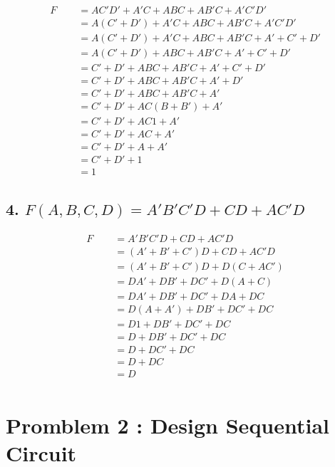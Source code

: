 \documentclass[12pt, letterpaper]{article}
\begin{document}
\begin{align*}
    F&=AC'D'+A'C+ABC+AB'C+A'C'D'\\
    \qquad &=A(C'+D')+A'C+ABC+AB'C+A'C'D'\\
    \qquad &=A(C'+D')+A'C+ABC+AB'C+A'+C'+D'\\
    \qquad &=A(C'+D')+ABC+AB'C+A'+C'+D'\\
    \qquad &=C'+D'+ABC+AB'C+A'+C'+D'\\
    \qquad &=C'+D'+ABC+AB'C+A'+D'\\
    \qquad &=C'+D'+ABC+AB'C+A'\\
    \qquad &=C'+D'+AC(B+B')+A'\\
    \qquad &=C'+D'+AC1+A'\\
    \qquad &=C'+D'+AC+A'\\
    \qquad &=C'+D'+A+A'\\
    \qquad &=C'+D'+1\\
    \qquad &=1
\end{align*}

\subsection*{4. $F(A,B,C,D)=A'B'C'D+CD+AC'D$}

\begin{align*}
    F&=A'B'C'D+CD+AC'D\\
    \qquad &=(A'+B'+C')D+CD+AC'D\\
    \qquad &=(A'+B'+C')D+D(C+AC')\\
    \qquad &=DA'+DB'+DC'+D(A+C)\\
    \qquad &=DA'+DB'+DC'+DA+DC\\
    \qquad &=D(A+A')+DB'+DC'+DC\\
    \qquad &=D1+DB'+DC'+DC\\
    \qquad &=D+DB'+DC'+DC\\
    \qquad &=D+DC'+DC\\
    \qquad &=D+DC\\
    \qquad &=D\\
\end{align*}

\section*{Promblem 2 : Design Sequential Circuit}
\end{document}
